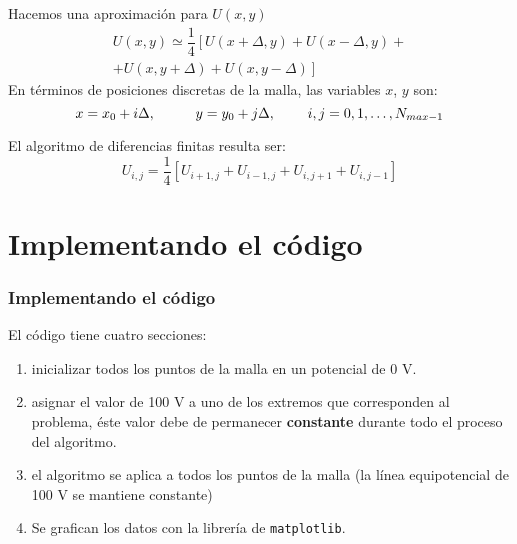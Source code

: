 \begin{frame}
\fontsize{14}{14}\selectfont
Hacemos una aproximación para $U(x,y)$
\begin{eqnarray*}
U(x,y) \simeq	\dfrac{1}{4} \left[ U(x+\Delta ,y) + U(x-\Delta,y) + \right. \\
\left. + U(x,y+\Delta) + U(x,y-\Delta) \right]
\end{eqnarray*}
En términos de posiciones discretas de la malla, las variables $x$, $y$ son:
\[ x= x_{0} + i \Delta, \hspace{1cm} y=y_{0}+ j \Delta, \hspace{0.8cm} i,j=0,1,\ldots,N_{max-1} \]
\end{frame}
\begin{frame}
\fontsize{14}{14}\selectfont
El algoritmo de diferencias finitas resulta ser:
\[ U_{i,j} = \dfrac{1}{4} [U_{i+1,j} + U_{i-1,j} + U_{i,j+1} + U_{i,j-1}] \]
\begin{center}
\end{center}
\end{frame}
\section{Implementando el código}
\begin{frame}
\fontsize{14}{14}\selectfont
\frametitle{Implementando el código}
El código tiene cuatro secciones:
\begin{enumerate}
\item inicializar todos los puntos de la malla en un potencial de 0 V.
\item asignar el valor de 100 V a uno de los extremos que corresponden al problema, éste valor debe de permanecer \textbf{constante} durante todo el proceso del algoritmo.
\item el algoritmo se aplica a todos los puntos de la malla (la línea equipotencial de 100 V se mantiene constante)
\item Se grafican los datos con la librería de \texttt{matplotlib}.
\end{enumerate}
\end{frame}
